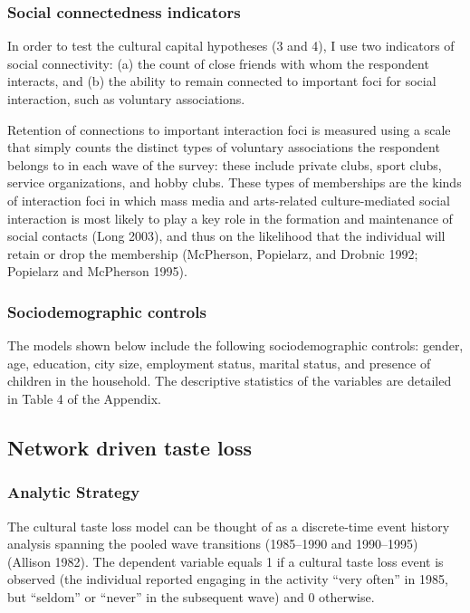 \documentclass[
]{article}
\begin{document}
\subsubsection{Social connectedness indicators}\label{social-connectedness-indicators}

In order to test the cultural capital hypotheses (3 and 4), I use two indicators of social connectivity: (a) the count of close friends with whom the respondent interacts, and (b) the ability to remain connected to important foci for social interaction, such as voluntary associations. 

Retention of connections to important interaction foci is measured using a scale that simply counts the distinct types of voluntary associations the respondent belongs to in each wave of the survey: these include private clubs, sport clubs, service organizations, and hobby clubs. These types of memberships are the kinds of interaction foci in which mass media and arts-related culture-mediated social interaction is most likely to play a key role in the formation and maintenance of social contacts (Long 2003), and thus on the likelihood that the individual will retain or drop the membership (McPherson, Popielarz, and Drobnic 1992; Popielarz and McPherson 1995).

\subsubsection{Sociodemographic controls}\label{sociodemographic-controls}

The models shown below include the following sociodemographic controls: gender, age, education, city size, employment status, marital status, and presence of children in the household. The descriptive statistics of the variables are detailed in Table 4 of the Appendix.

\subsection{Network driven taste loss}\label{network-driven-taste-loss}

\subsubsection{Analytic Strategy}\label{analytic-strategy}

The cultural taste loss model can be thought of as a discrete-time event history analysis spanning the pooled wave transitions (1985--1990 and 1990--1995) (Allison 1982). The dependent variable equals 1 if a cultural taste loss event is observed (the individual reported engaging in the activity ``very often'' in 1985, but ``seldom'' or ``never'' in the subsequent wave) and 0 otherwise. 
\end{document}
